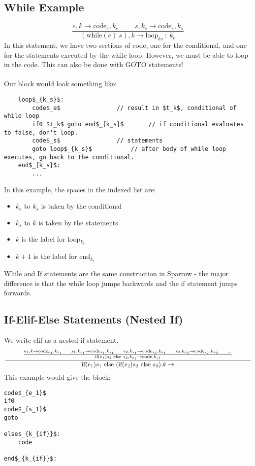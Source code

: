 \documentclass[10pt]{article}
\begin{document}
\subsection*{While Example}
\[\frac{e, k \rightarrow \text{code}_e, k_e \hspace{1cm} s, k_e \rightarrow \text{code}_s, k_s}{(\text{while}(e)\: s), k \rightarrow \text{loop}_{ks} \::\: k_e}\]
In this statement, we have two sections of code, one for the conditional, and one for the statements executed by the while loop.  However, we must be able to loop in the code.  This can also be done with GOTO statements!\\\\
Our block would look something like:
\begin{lstlisting}
    loop$_{k_s}$:
        code$_e$                // result in $t_k$, conditional of while loop
        if0 $t_k$ goto end$_{k_s}$       // if conditional evaluates to false, don't loop.
        code$_s$                // statements
        goto loop$_{k_s}$           // after body of while loop executes, go back to the conditional.
    end$_{k_s}$:
        ...
\end{lstlisting}
In this example, the spaces in the indexed list are:
\begin{itemize}
    \item $k_e$ to $k_s$ is taken by the conditional
    \item $k_s$ to $k$ is taken by the statements
    \item $k$ is the label for loop$_{k_s}$
    \item $k + 1$ is the label for end$_{k_s}$
\end{itemize}
While and If statements are the same construction in Sparrow - the major difference is that the while loop jumps backwards and the if statement jumps forwards.

\subsection*{If-Elif-Else Statements (Nested If)}
We write elif as a nested if statement.
\[\frac{\hspace{1cm}\frac{e_1, k \rightarrow \text{code}_{e_1}, k_{e_1} \hspace{0.5cm} s_1, k_{e_1} \rightarrow \text{code}_{s_1}, k_{s_1} \hspace{0.5cm} e_2, k_{s_1} \rightarrow \text{code}_{s_2}, k_{e_1} \hspace{0.5cm} s_2, k_{e_2} \rightarrow \text{code}_{s_2}, k_{s_2} \hspace{0.5cm}\dots}{\text{if}(e_1) s_2 \text{ else } s_2, k_{e_1} \rightarrow \text{code}, k_{if}}\hspace{1cm}}{\text{if}(e_1) s_1 \text{ else } (\text{if} (e_2) s_2 \text{ else } s_3). k \rightarrow }\]
This example would give the block:
\begin{lstlisting}
code$_{e_1}$
if0
code$_{s_1}$
goto

else$_{k_{if}}$:
    code

end$_{k_{if}}$:

\end{lstlisting}
\end{document}
